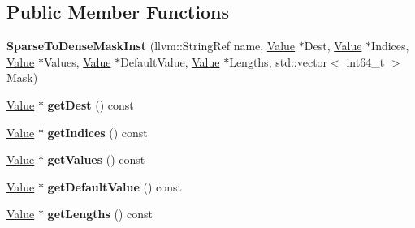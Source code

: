 \subsection*{Public Member Functions}
\begin{DoxyCompactItemize}
\item 
\mbox{\label{classglow_1_1_sparse_to_dense_mask_inst_a4a6481d691f30d0c09faff378db59a2d}} 
{\bfseries Sparse\+To\+Dense\+Mask\+Inst} (llvm\+::\+String\+Ref name, \hyperlink{classglow_1_1_value}{Value} $\ast$Dest, \hyperlink{classglow_1_1_value}{Value} $\ast$Indices, \hyperlink{classglow_1_1_value}{Value} $\ast$Values, \hyperlink{classglow_1_1_value}{Value} $\ast$Default\+Value, \hyperlink{classglow_1_1_value}{Value} $\ast$Lengths, std\+::vector$<$ int64\+\_\+t $>$ Mask)
\item 
\mbox{\label{classglow_1_1_sparse_to_dense_mask_inst_a0aa5733c56294b289d08088ed8430ff0}} 
\hyperlink{classglow_1_1_value}{Value} $\ast$ {\bfseries get\+Dest} () const
\item 
\mbox{\label{classglow_1_1_sparse_to_dense_mask_inst_a687d41f04262e307c483228d6738d89c}} 
\hyperlink{classglow_1_1_value}{Value} $\ast$ {\bfseries get\+Indices} () const
\item 
\mbox{\label{classglow_1_1_sparse_to_dense_mask_inst_a4d23a787014f63795b412f6108edc2ad}} 
\hyperlink{classglow_1_1_value}{Value} $\ast$ {\bfseries get\+Values} () const
\item 
\mbox{\label{classglow_1_1_sparse_to_dense_mask_inst_a7893896f2dff317493ec57e9671e0729}} 
\hyperlink{classglow_1_1_value}{Value} $\ast$ {\bfseries get\+Default\+Value} () const
\item 
\mbox{\label{classglow_1_1_sparse_to_dense_mask_inst_a8c212e6c0cf8d4589b73565ce7f14692}} 
\hyperlink{classglow_1_1_value}{Value} $\ast$ {\bfseries get\+Lengths} () const
\item 
\mbox{\label{classglow_1_1_sparse_to_dense_mask_inst_aa49ae9a8341cc75d4979a5bedbba9247}} 

\end{DoxyCompactItemize}
